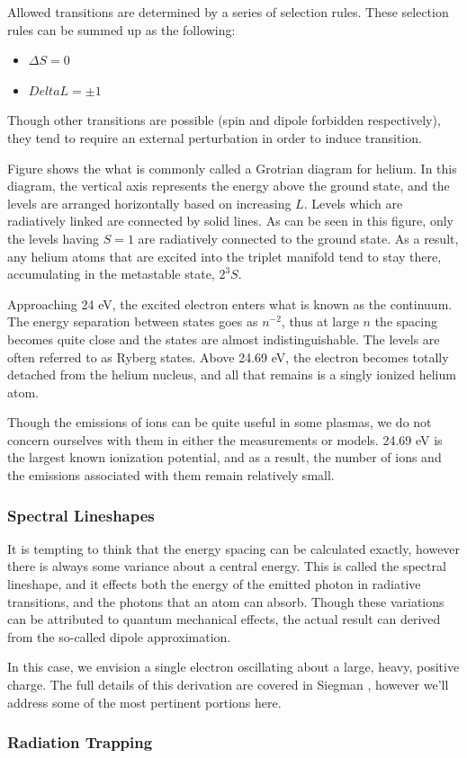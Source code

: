 Allowed transitions are determined by a series of selection rules. These
selection rules can be summed up as the following:
\begin{itemize}
    \item $\Delta S = 0$
    \item $Delta L = \pm1$
\end{itemize}
Though other transitions are possible (spin and dipole forbidden respectively),
they tend to require an external perturbation in order to induce transition.

Figure \missingfigure{} shows the what is commonly called a Grotrian diagram for
helium. In this diagram, the vertical axis represents the energy above the
ground state, and the levels are arranged horizontally based on increasing $L$.
Levels which are radiatively linked are connected by solid lines. As can be seen
in this figure, only the levels having $S=1$ are radiatively connected to the
ground state. As a result, any helium atoms that are excited into the triplet
manifold tend to stay there, accumulating in the metastable state, $2^3S$.

Approaching 24 eV, the excited electron enters what is known as the continuum.
The energy separation between states goes as $n^{-2}$, thus at large $n$ the
spacing becomes quite close and the states are almost indistinguishable. The
levels are often referred to as Ryberg states. Above 24.69 eV, the electron
becomes totally detached from the helium nucleus, and all that remains is
a singly ionized helium atom.

Though the emissions of ions can be quite useful in some plasmas, we do not
concern ourselves with them in either the measurements or models. 24.69 eV is
the largest known ionization potential, and as a result, the number of ions and
the emissions associated with them remain relatively small.

\subsubsection{Spectral Lineshapes}
It is tempting to think that the energy spacing can be calculated exactly,
however there is always some variance about a central energy. This is called the
spectral lineshape, and it effects both the energy of the emitted photon in
radiative transitions, and the photons that an atom can absorb. Though these
variations can be attributed to quantum mechanical effects, the actual result
can derived from the so-called dipole approximation.

In this case, we envision a single electron oscillating about a large, heavy,
positive charge. The full details of this derivation are covered in Siegman
\cite{Siegman1986}, however we'll address some of the most pertinent portions
here.

\subsubsection{Radiation Trapping}
